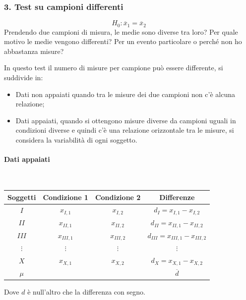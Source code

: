 \documentclass[a4paper, 15pt]{article}
\begin{document}
\subsubsection{3. Test su campioni differenti}
\begin{adjustwidth}{2in}{}			
\[H_0: \overline{x}_1 = \overline{x}_2\]		
		Prendendo due campioni di misura, le medie sono diverse tra loro? Per quale motivo le medie vengono differenti? Per un evento particolare o perché non ho abbastanza misure? 
		
		In questo test il numero di misure per campione può essere differente, si suddivide in: 
		\begin{itemize}
			\item Dati non appaiati quando tra le misure dei due campioni non c'è alcuna relazione; 
			\item Dati appaiati, quando si ottengono misure diverse da campioni uguali in condizioni diverse e quindi c'è una relazione orizzontale tra le misure, si considera la variabilità di ogni soggetto. 
		\end{itemize}  
\newpage		
		\paragraph{Dati appaiati} \mbox{} \\ 
		\begin{table}[H]
			\centering	
			\begin{tabular}{|c|c|c|c|}
				\hline
				Soggetti & Condizione 1 & Condizione 2 &            Differenze             \\ \hline
				  $I$    &  $x_{I,1} $  &  $x_{I,2}$   &     $d_I = x_{I,1} - x_{I,2}$     \\ \hline
				  $II$   &  $x_{II,1}$  &  $x_{II,2}$  &  $d_{II} = x_{II,1} - x_{II,2}$   \\ \hline
				 $III$   & $x_{III,1}$  & $x_{III,2}$  & $d_{III} = x_{III,1} - x_{III,2}$ \\ \hline
				$\vdots$ &   $\vdots$   &   $\vdots$   &             $\vdots$              \\ \hline
				  $X$    &  $x_{X,1}$   &  $x_{X,2}$   &     $d_X = x_{X,1} - x_{X,2}$     \\ \hline
				 $\mu$   &              &              &          $\overline{d}$           \\ \hline
			\end{tabular}
		\end{table}
		
		Dove $d$ è null'altro che la differenza con segno. 
		

\end{adjustwidth}
\end{document}
